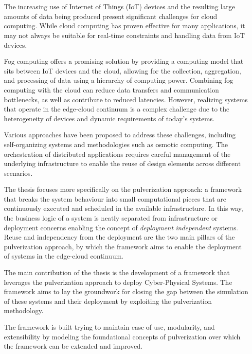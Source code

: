 \chapter{\conclusionsname}
\label{chap:conclusions}

The increasing use of Internet of Things (IoT) devices and the resulting large amounts of data being produced present significant challenges for
cloud computing. While cloud computing has proven effective for many applications, it may not always be suitable for real-time constraints and
handling data from IoT devices.

Fog computing offers a promising solution by providing a computing model that sits between IoT devices and the cloud,
allowing for the collection, aggregation, and processing of data using a hierarchy of computing power. Combining fog computing with the cloud can
reduce data transfers and communication bottlenecks, as well as contribute to reduced latencies. However, realizing systems that operate in the
edge-cloud continuum is a complex challenge due to the heterogeneity of devices and dynamic requirements of today's systems.

Various approaches have been proposed to address these challenges, including self-organizing systems and methodologies such as osmotic computing.
The orchestration of distributed applications requires careful management of the underlying infrastructure to enable the reuse of design
elements across different scenarios.

The thesis focuses more specifically on the pulverization approach: a framework that breaks the system behaviour into small computational pieces that
are continuously executed and scheduled in the available infrastructure.
In this way, the business logic of a system is neatly separated from infrastructure or deployment concerns enabling the concept of
\emph{deployment independent} systems.
Reuse and independency from the deployment are the two main pillars of the pulverization approach, by which the framework aims to enable the
deployment of systems in the edge-cloud continuum.

The main contribution of the thesis is the development of a framework that leverages the pulverization approach to deploy Cyber-Physical Systems.
The framework aims to lay the groundwork for closing the gap between the simulation of these systems and their deployment by exploiting the
pulverization methodology.

The framework is built trying to maintain ease of use, modularity, and extensibility by modeling the foundational concepts of pulverization over
which the framework can be extended and improved.

